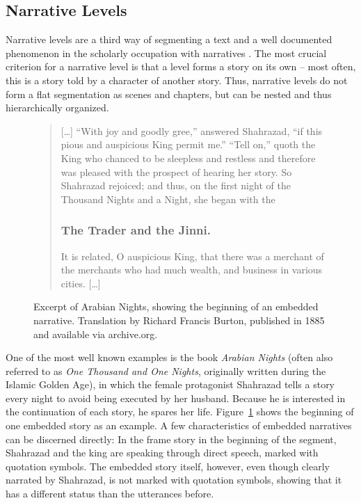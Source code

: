 \documentclass[10pt, a4paper]{article}
\begin{document}
\subsection{Narrative Levels}
Narrative levels are a third way of segmenting a text and a well documented phenomenon in the scholarly occupation with narratives \cite[43\,ff.]{Bal:1997aa}. The most crucial criterion for a narrative level is that a level forms a story on its own -- most often, this is a story told by a character of another story. Thus, narrative levels do not form a flat segmentation as scenes and chapters, but can be nested and thus hierarchically organized. 

\begin{figure}
\begin{quote}
[\dots] \enquote{With joy and goodly gree,} answered Shahrazad, \enquote{if this pious and auspicious King permit me.} \enquote{Tell on,} quoth the King who chanced to be sleepless and restless and therefore was pleased with the prospect of hearing her story. So Shahrazad rejoiced; and thus, on the first night of the Thousand Nights and a Night, she began with the

\subsubsection*{The Trader and the Jinni.}

It is related, O auspicious King, that there was a merchant of the merchants who had much wealth, and business in various cities. [\dots]
\end{quote}
\caption{Excerpt of Arabian Nights, showing the beginning of an embedded narrative. Translation by Richard Francis Burton, published in 1885 and available via archive.org.}
\label{fig:arabian-nights}
\end{figure}

One of the most well known examples is the book \textit{Arabian Nights} (often also referred to as \textit{One Thousand and One Nights}, originally written during the Islamic Golden Age), in which the female protagonist Shahrazad tells a story every night to avoid being executed by her husband. Because he is interested in the continuation of each story, he spares her life. Figure~\ref{fig:arabian-nights} shows the beginning of one embedded story as an example. A few characteristics of embedded narratives can be discerned directly: In the frame story in the beginning of the segment, Shahrazad and the king are speaking through direct speech, marked with quotation symbols. The embedded story itself, however, even though clearly narrated by Shahrazad, is not marked with quotation symbols, showing that it has a different status than the utterances before.
\end{document}
